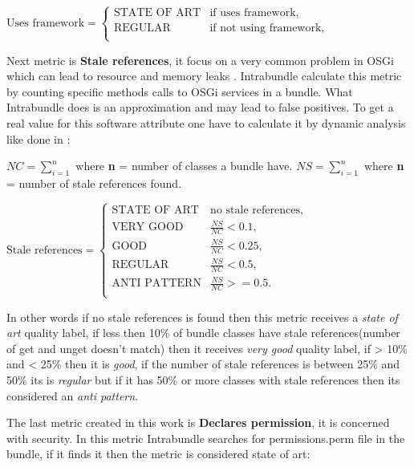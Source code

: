 \(\text{Uses framework}=\begin{cases}
\text{STATE OF ART}& \text{if uses framework},\\
\text{REGULAR}& \text{if not using framework}, \\
\end{cases} \)  \newline

Next metric is \textbf{Stale references}, it focus on a very common problem in OSGi which can lead to resource and memory leaks \citep{Gama 2011}. Intrabundle calculate this metric by counting specific methods calls to OSGi services in a bundle. What Intrabundle does is an approximation and may lead to false positives. To get a real value for this software attribute one have to calculate it by dynamic analysis like done in \citep{Gama 2012}:\newline

\(NC = \sum_{i=1}^{n} \) where \textbf{n} = number of classes a bundle have. \newline
\(NS = \sum_{i=1}^{n} \) where \textbf{n} = number of stale references found. \newline

\(\text{Stale references}=\begin{cases}
\text{STATE OF ART}& \text{no stale references},\\
\text{VERY GOOD}& \frac{NS}{NC} < 0.1, \\
\text{GOOD}& \frac{NS}{NC} < 0.25, \\
\text{REGULAR}& \frac{NS}{NC} < 0.5, \\
\text{ANTI PATTERN}& \frac{NS}{NC} >= 0.5. \\
\end{cases} \)\newline     

In other words if no stale references is found then this metric receives a \emph{state of art} quality label, if less then 10\% of bundle classes have stale references(number of get and unget doesn't match) then it receives \emph{very good} quality label, if > 10\% and < 25\% then it is \emph{good}, if the number of stale references is between 25\% and 50\% its is \emph{regular} but if it has 50\% or more classes with stale references then its considered an \emph{anti pattern}. 

The last metric created in this work is \textbf{Declares permission}, it is concerned with security. In this metric Intrabundle searches for permissions.perm file in the bundle, if it finds it then the metric is considered state of art: \newline


